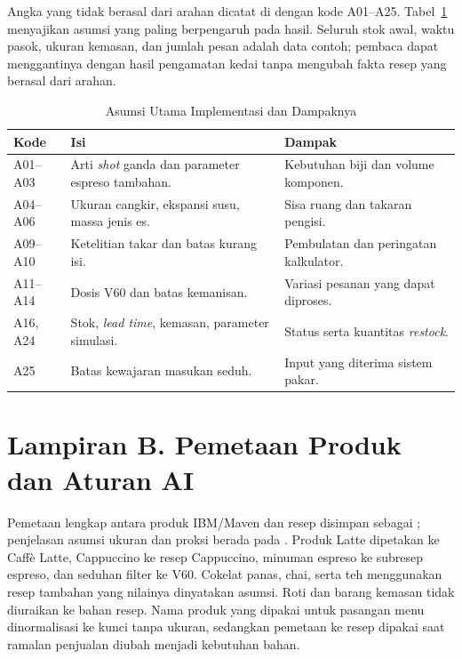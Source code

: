 Angka yang tidak berasal dari arahan dicatat di  dengan kode A01--A25. Tabel~\ref{tab:lampiran-asumsi} menyajikan asumsi yang paling berpengaruh pada hasil. Seluruh stok awal, waktu pasok, ukuran kemasan, dan jumlah pesan adalah data contoh; pembaca dapat menggantinya dengan hasil pengamatan kedai tanpa mengubah fakta resep yang berasal dari arahan.

\begin{table}[htbp]
\centering
\caption{Asumsi Utama Implementasi dan Dampaknya}
\label{tab:lampiran-asumsi}
\begin{tabular}{lp{}p{}}
\toprule
Kode & Isi & Dampak \\
\midrule
A01--A03 & Arti \textit{shot} ganda dan parameter espreso tambahan. & Kebutuhan biji dan volume komponen. \\
A04--A06 & Ukuran cangkir, ekspansi susu, massa jenis es. & Sisa ruang dan takaran pengisi. \\
A09--A10 & Ketelitian takar dan batas kurang isi. & Pembulatan dan peringatan kalkulator. \\
A11--A14 & Dosis V60 dan batas kemanisan. & Variasi pesanan yang dapat diproses. \\
A16, A24 & Stok, \textit{lead time}, kemasan, parameter simulasi. & Status serta kuantitas \textit{restock}. \\
A25 & Batas kewajaran masukan seduh. & Input yang diterima sistem pakar. \\
\bottomrule
\end{tabular}
\end{table}

\section*{Lampiran B. Pemetaan Produk dan Aturan AI}
{}

Pemetaan lengkap antara produk IBM/Maven dan resep disimpan sebagai ; penjelasan asumsi ukuran dan proksi berada pada . Produk Latte dipetakan ke Caffè Latte, Cappuccino ke resep Cappuccino, minuman espreso ke subresep espreso, dan seduhan filter ke V60. Cokelat panas, chai, serta teh menggunakan resep tambahan yang nilainya dinyatakan asumsi. Roti dan barang kemasan tidak diuraikan ke bahan resep. Nama produk yang dipakai untuk pasangan menu dinormalisasi ke kunci tanpa ukuran, sedangkan pemetaan ke resep dipakai saat ramalan penjualan diubah menjadi kebutuhan bahan.

